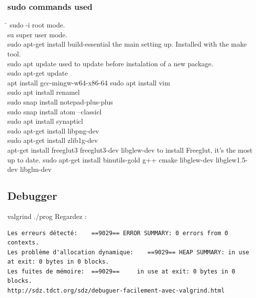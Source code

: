 \documentclass[12pt]{article}
\begin{document}
\subsubsection{sudo commands used}
\begin{tabbing}
\hspace{10cm}\=\kill
sudo -i \> root mode.\\
su \> super user mode.\\
sudo apt-get install build-essential \> the main setting up. Installed with the make tool.\\
sudo apt update \> used to update before instalation of a new package.\\
sudo apt-get update \\
apt install gcc-mingw-w64-x86-64 \> 
sudo apt install vim\\ 
sudo apt install renamel \> \\
sudo snap install notepad-plus-plus\\
sudo snap install atom --classicl \> \\
sudo apt install synapticl \> \\
sudo apt-get install libpng-dev \> \\ 
sudo apt-get install zlib1g-dev \> \\

apt-get install freeglut3 freeglut3-dev libglew-dev \> to install Freeglut, it's the most up to date.
sudo apt-get install binutils-gold g++ cmake libglew-dev libglew1.5-dev libglm-dev\\
\end{tabbing}


\subsection{Debugger}
valgrind ./prog
Regardez :
\begin{lstlisting}
Les erreurs détecté:	==9029== ERROR SUMMARY: 0 errors from 0 contexts.
Les problème d'allocation dynamique: 	==9029== HEAP SUMMARY: in use at exit: 0 bytes in 0 blocks.
Les fuites de mémoire: 	==9029==     in use at exit: 0 bytes in 0 blocks.
http://sdz.tdct.org/sdz/debuguer-facilement-avec-valgrind.html
\end{lstlisting}
\end{document}
